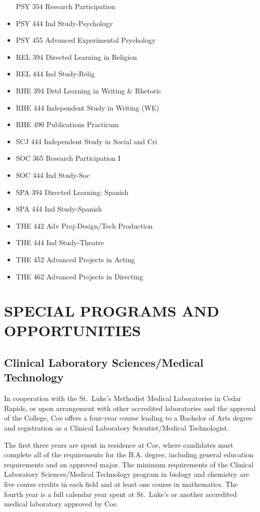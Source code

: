 \documentclass[
  letterpaper,
]{scrbook}
\begin{document}
\begin{itemize}
  PSY 354 Research Participation
\item
  PSY 444 Ind Study-Psychology
\item
  PSY 455 Advanced Experimental Psychology
\item
  REL 394 Directed Learning in Religion
\item
  REL 444 Ind Study-Relig
\item
  RHE 394 Drtd Learning in Writing \& Rhetoric
\item
  RHE 444 Independent Study in Writing (WE)
\item
  RHE 490 Publications Practicum
\item
  SCJ 444 Independent Study in Social and Cri
\item
  SOC 365 Research Participation I
\item
  SOC 444 Ind Study-Soc
\item
  SPA 394 Directed Learning: Spanish
\item
  SPA 444 Ind Study-Spanish
\item
  THE 442 Adv Proj-Design/Tech Production
\item
  THE 444 Ind Study-Theatre
\item
  THE 452 Advanced Projects in Acting
\item
  THE 462 Advanced Projects in Directing
\end{itemize}

\chapter{SPECIAL PROGRAMS AND
OPPORTUNITIES}\label{special-programs-and-opportunities}

\section{Clinical Laboratory Sciences/Medical
Technology}\label{clinical-laboratory-sciencesmedical-technology}

In cooperation with the St.~Luke's Methodist Medical Laboratories in
Cedar Rapids, or upon arrangement with other accredited laboratories and
the approval of the College, Coe offers a four-year course leading to a
Bachelor of Arts degree and registration as a Clinical Laboratory
Scientist/Medical Technologist.

The first three years are spent in residence at Coe, where candidates
must complete all of the requirements for the B.A. degree, including
general education requirements and an approved major. The minimum
requirements of the Clinical Laboratory Sciences/Medical Technology
program in biology and chemistry are five course credits in each field
and at least one course in mathematics. The fourth year is a full
calendar year spent at St.~Luke's or another accredited medical
laboratory approved by Coe.
\end{document}
